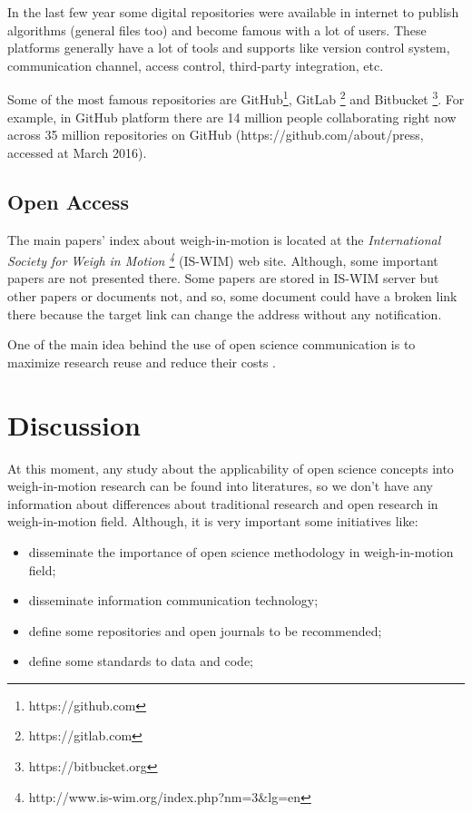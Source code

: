 \documentclass[a4paper]{article}
\begin{document}
{In the last few year some digital repositories were available in internet to publish algorithms (general files too) and become famous with a lot of users. These platforms generally have a lot of tools and supports like version control system, communication channel, access control, third-party integration, etc.

Some of the most famous repositories are GitHub\footnote{https://github.com}, GitLab \footnote{https://gitlab.com} and Bitbucket \footnote{https://bitbucket.org}. For example, in GitHub platform there are 14 million people collaborating right now across 35 million repositories on GitHub (https://github.com/about/press, accessed at March 2016).
 
\subsection{Open Access}\label{open-access}

The main papers' index	about weigh-in-motion is located at the \textit{International Society for Weigh in Motion \footnote{http://www.is-wim.org/index.php?nm=3$\&$lg=en}} (IS-WIM) web site. Although, some important papers are not presented there. Some papers are stored in IS-WIM server but other papers or documents not, and so, some document could have a broken link there because the target link can change the address without any notification. 

One of the main idea behind the use of open science communication is to maximize research reuse and reduce their costs \cite{assante2015science}.



\section{Discussion}\label{discussion}

At this moment, any study about the applicability of open science concepts into weigh-in-motion research can be found into literatures, so we don't have any information about differences about traditional research and open research in weigh-in-motion field. Although, it is very important some initiatives like:

\begin{itemize}
\item disseminate the importance of open science methodology in weigh-in-motion field;
\item disseminate information communication technology;
\item define some repositories and open journals to be recommended;
\item define some standards to data and code;
\end{itemize}

}
\end{document}
